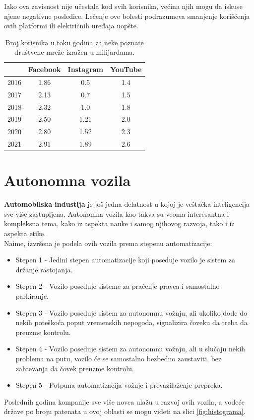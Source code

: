\documentclass[a4paper]{article}
\begin{document}
Iako ova zavisnost nije učestala kod svih korisnika, većina njih mogu da iskuse njene negativne posledice. Lečenje ove bolesti podrazumeva smanjenje korišćenja ovih platformi ili električnih uređaja uopšte.


\begin{table}[h!]
\begin{center}

\begin{tabular}{|c|c|c|c|} \hline
 & Facebook & Instagram & YouTube\\ \hline
2016 & 1.86 & 0.5 & 1.4 \\ \hline
2017 & 2.13 & 0.7 & 1.5\\ \hline
2018 & 2.32 & 1.0 & 1.8 \\ \hline
2019 & 2.50 & 1.21 & 2.0 \\ \hline
2020 & 2.80 & 1.52 & 2.3 \\ \hline
2021 & 2.91 & 1.89 & 2.6 \\ \hline
\end{tabular}
\label{tab:tabela1}
\end{center}
\caption{Broj korisnika u toku godina za neke poznate društvene mreže izražen u milijardama.}
\end{table}
 


\section{Autonomna vozila}
\label{sec:Autonomna vozila}
\textbf{Automobilska industija} je još jedna delatnost u kojoj je veštačka inteligencija sve više zastupljena. Autonomna vozila kao takva su veoma interesantna i kompleksna tema, kako iz aspekta nauke i samog njihovog razvoja, tako i iz aspekta etike.\\
Naime, izvršena je podela ovih vozila prema stepenu automatizacije:
\begin{itemize}
 \item {Stepen 1 - Jedini stepen automatizacije koji poseduje vozilo je sistem za držanje rastojanja.}
 \item {Stepen 2 - Vozilo poseduje sisteme za praćenje pravca i samostalno parkiranje.}
 \item {Stepen 3 - Vozilo poseduje sistem za autonomnu vožnju, ali ukoliko dođe do nekih poteškoća poput vremenskih nepogoda, signalizira čoveku da treba da preuzme kontrolu.}
 \item {Stepen 4 - Vozilo poseduje sistem za autonomnu vožnju, ali u slučaju nekih problema na putu, vozilo će se samostalno bezbedno zaustaviti, bez zahtevanja da čovek preuzme kontrolu.}
 \item {Stepen 5 - Potpuna automatizacija vožnje i prevazilaženje prepreka.}
\end{itemize} 
Poslednih godina kompanije sve više novca ulažu u razvoj ovih vozila, a vodeće države po broju patenata u ovoj oblasti se mogu videti na slici \ref{fig:histograma}.
\end{document}
